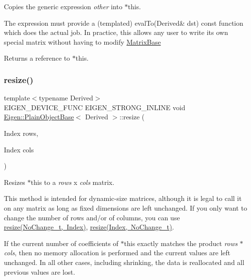 Copies the generic expression {\itshape other} into $\ast$this. 

The expression must provide a (templated) eval\+To(\+Derived\& dst) const function which does the actual job. In practice, this allows any user to write its own special matrix without having to modify \mbox{\hyperlink{class_eigen_1_1_matrix_base}{Matrix\+Base}}

\begin{DoxyReturn}{Returns}
a reference to $\ast$this. 
\end{DoxyReturn}
\mbox{\label{class_eigen_1_1_plain_object_base_a99d9054ee2d5a40c6e00ded0265e9cea}} 
\subsubsection{\texorpdfstring{resize()}{resize()}\hspace{0.1cm}{\footnotesize\ttfamily [1/4]}}
{\footnotesize\ttfamily template$<$typename Derived$>$ \\
E\+I\+G\+E\+N\+\_\+\+D\+E\+V\+I\+C\+E\+\_\+\+F\+U\+NC E\+I\+G\+E\+N\+\_\+\+S\+T\+R\+O\+N\+G\+\_\+\+I\+N\+L\+I\+NE void \mbox{\hyperlink{class_eigen_1_1_plain_object_base}{Eigen\+::\+Plain\+Object\+Base}}$<$ Derived $>$\+::resize (\begin{DoxyParamCaption}\item[{Index}]{rows,  }\item[{Index}]{cols }\end{DoxyParamCaption})\hspace{0.3cm}{\ttfamily [inline]}}

Resizes {\ttfamily $\ast$this} to a {\itshape rows} x {\itshape cols} matrix.

This method is intended for dynamic-\/size matrices, although it is legal to call it on any matrix as long as fixed dimensions are left unchanged. If you only want to change the number of rows and/or of columns, you can use \mbox{\hyperlink{class_eigen_1_1_plain_object_base_ab71a655f73d05a0e389e3ed13b6fe5f3}{resize(\+No\+Change\+\_\+t, Index)}}, \mbox{\hyperlink{class_eigen_1_1_plain_object_base_a7b44761b7350ae3756035bbf7d7c04f6}{resize(\+Index, No\+Change\+\_\+t)}}.

If the current number of coefficients of {\ttfamily $\ast$this} exactly matches the product {\itshape rows} $\ast$ {\itshape cols}, then no memory allocation is performed and the current values are left unchanged. In all other cases, including shrinking, the data is reallocated and all previous values are lost.

